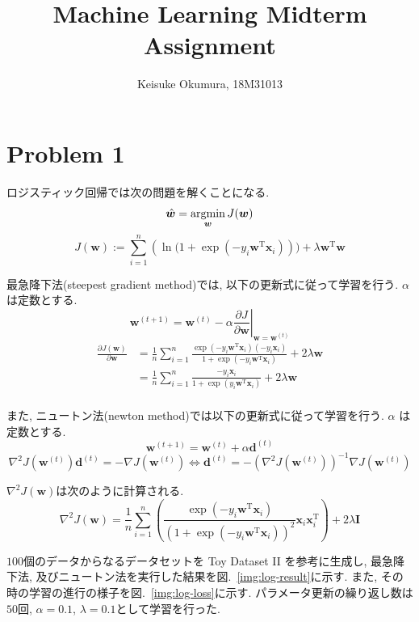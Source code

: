 \documentclass[a4paper,10pt]{jsarticle}
\title{Machine Learning Midterm Assignment}
\author{Keisuke Okumura, 18M31013}
\newcommand{\argmin}{\mathop{\rm argmin}\limits}
\newcommand{\coloneq}{:=}
\begin{document}
\maketitle

\section*{Problem 1}
ロジスティック回帰では次の問題を解くことになる.
\[ \hat{\bm{w}} = \argmin_{\bm{w}}J(\bm{w}) \]
\[
 J(\bm{w}) \coloneq \sum_{i=1}^{n}(
 \ln{(1 + \exp{(-y_i\bm{w}^\mathrm{T}\bm{x}_i)}}))
 + \lambda \bm{w}^\mathrm{T}\bm{w}
\]

最急降下法(steepest gradient method)では, 以下の更新式に従って学習を行う. $\alpha$ は定数とする.
\[
\bm{w}^{(t+1)} = \bm{w}^{(t)} - \alpha\left.\frac{\partial J}{\partial \bm{w}}\right|_{\bm{w}=\bm{w}^{(t)}}
\]
\begin{align*}
\frac{\partial J(\bm{w})}{\partial \bm{w}}
 &= \frac{1}{n}\sum_{i=1}^{n}
 \frac{\exp(-y_i\bm{w}^\mathrm{T}\bm{x}_i)(-y_i\bm{x}_i)}
 {1 + \exp(-y_i\bm{w}^\mathrm{T}\bm{x}_i)}
 + 2\lambda\bm{w}\\
 &=\frac{1}{n}\sum_{i=1}^{n}
 \frac{-y_i\bm{x}_i}
 {1 + \exp(y_i\bm{w}^\mathrm{T}\bm{x}_i)}
 + 2\lambda\bm{w}\\
\end{align*}

また, ニュートン法(newton method)では以下の更新式に従って学習を行う. $\alpha$ は定数とする.
\[ \bm{w}^{(t+1)} = \bm{w}^{(t)} + \alpha\bm{d}^{(t)} \]
\[ \nabla^2J(\bm{w}^{(t)})\bm{d}^{(t)} = -\nabla J(\bm{w}^{(t)})
\Longleftrightarrow
\bm{d}^{(t)} = - (\nabla^2J(\bm{w}^{(t)}))^{-1} \nabla J(\bm{w}^{(t)})
\]

$\nabla^2J(\bm{w})$は次のように計算される.
\[
 \nabla^2J(\bm{w}) = \frac{1}{n}\sum_{i=1}^{n}
 \left(\frac{\exp(-y_i\bm{w}^\mathrm{T}\bm{x}_i)}
 {(1 + \exp(-y_i\bm{w}^\mathrm{T}\bm{x}_i))^2}\bm{x}_i\bm{x}_i^\mathrm{T}\right) + 2\lambda\bm{I}
\]

$100$個のデータからなるデータセットを Toy Dataset I\hspace{-1pt}I を参考に生成し,
最急降下法, 及びニュートン法を実行した結果を図.~\ref{img:log-result}に示す.
また, その時の学習の進行の様子を図.~\ref{img:log-loss}に示す.
パラメータ更新の繰り返し数は$50$回, $\alpha=0.1$, $\lambda=0.1$として学習を行った.
\end{document}
